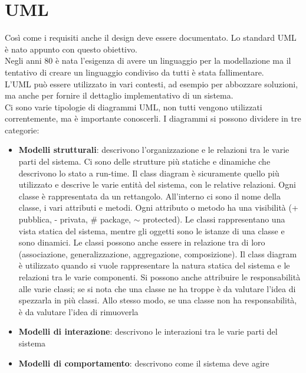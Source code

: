 \section{UML}
\label{sec:05_uml}
Così come i requisiti anche il design deve essere documentato.
Lo standard \acrfull{UML} è nato appunto con questo obiettivo.\\
Negli anni 80 è nata l'esigenza di avere un linguaggio per la modellazione ma il tentativo di creare un linguaggio condiviso da tutti è stata fallimentare.\\
L'UML può essere utilizzato in vari contesti, ad esempio per abbozzare soluzioni, ma anche per fornire il dettaglio implementativo di un sistema.\\
Ci sono varie tipologie di diagrammi UML, non tutti vengono utilizzati correntemente, ma è importante conoscerli.
I diagrammi si possono dividere in tre categorie:
\begin{itemize}[noitemsep]
    \item \textbf{Modelli strutturali}: descrivono l'organizzazione e le relazioni tra le varie parti del sistema. Ci sono delle strutture più statiche e dinamiche che descrivono lo stato a run-time. Il class diagram è sicuramente quello più utilizzato e descrive le varie entità del sistema, con le relative relazioni. Ogni classe è rappresentata da un rettangolo. All'interno ci sono il nome della classe, i vari attributi e metodi. Ogni attributo o metodo ha una visibilità (+ pubblica, - privata, \# package, $\sim$ protected). Le classi rappresentano una vista statica del sistema, mentre gli oggetti sono le istanze di una classe e sono dinamici. Le classi possono anche essere in relazione tra di loro (associazione, generalizzazione, aggregazione, composizione). Il class diagram è utilizzato quando si vuole rappresentare la natura statica del sistema e le relazioni tra le varie componenti. Si possono anche attribuire le responsabilità alle varie classi; se si nota che una classe ne ha troppe è da valutare l'idea di spezzarla in più classi. Allo stesso modo, se una classe non ha responsabilità, è da valutare l'idea di rimuoverla
    \item \textbf{Modelli di interazione}: descrivono le interazioni tra le varie parti del sistema
    \item \textbf{Modelli di comportamento}: descrivono come il sistema deve agire
\end{itemize}